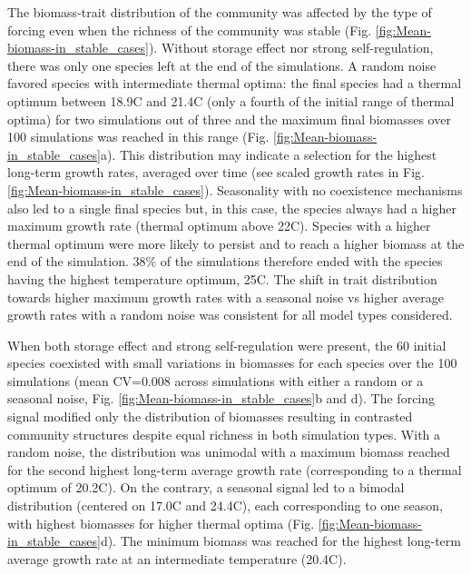\documentclass[a4paper,12pt]{article}
\begin{document}
The biomass-trait distribution of the community was affected by the
type of forcing even when the richness of the community was stable
(Fig. \ref{fig:Mean-biomass-in_stable_cases}). Without storage effect
nor strong self-regulation, there was only one species left at the
end of the simulations. A random noise favored species with intermediate
thermal optima: the final species had a thermal optimum between 18.9\textdegree C
and 21.4\textdegree C (only a fourth of the initial range of thermal optima)
for two simulations out of three and the maximum final biomasses over
100 simulations was reached in this range (Fig. \ref{fig:Mean-biomass-in_stable_cases}a).
This distribution may indicate a selection for the highest long-term
growth rates, averaged over time (see scaled growth rates in Fig.
\ref{fig:Mean-biomass-in_stable_cases}). Seasonality with no coexistence
mechanisms also led to a single final species but, in this case, the
species always had a higher maximum growth rate (thermal optimum above
22\textdegree C). Species with a higher thermal optimum were more likely to persist
and to reach a higher biomass at the end of the simulation. 38\% of
the simulations therefore ended with the species having the highest
temperature optimum, 25\textdegree C. The shift in trait distribution towards
higher maximum growth rates with a seasonal noise vs higher average
growth rates with a random noise was consistent for all model types
considered. 

When both storage effect and strong self-regulation were present,
the 60 initial species coexisted with small variations in biomasses
for each species over the 100 simulations (mean CV=0.008 across simulations
with either a random or a seasonal noise, Fig. \ref{fig:Mean-biomass-in_stable_cases}b
and d). The forcing signal modified only the distribution of biomasses
resulting in contrasted community structures despite equal richness
in both simulation types. With a random noise, the distribution was
unimodal with a maximum biomass reached for the second highest long-term
average growth rate (corresponding to a thermal optimum of 20.2\textdegree C).
On the contrary, a seasonal signal led to a bimodal distribution (centered
on 17.0\textdegree C and 24.4\textdegree C), each corresponding to one season, with highest
biomasses for higher thermal optima (Fig. \ref{fig:Mean-biomass-in_stable_cases}d).
The minimum biomass was reached for the highest long-term average
growth rate at an intermediate temperature (20.4\textdegree C).
\end{document}
